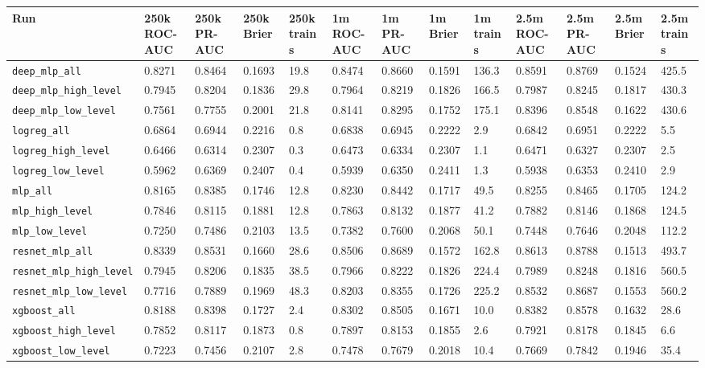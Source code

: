 \documentclass[11pt,a4paper,oneside]{report}
\begin{document}
\begin{landscape}

\small\setlength{\tabcolsep}{3pt}\renewcommand{\arraystretch}{1.15}
\begin{longtable}{p{2.2cm} p{1.35cm} p{1.35cm} p{1.35cm} p{1.35cm} p{1.35cm} p{1.35cm} p{1.35cm} p{1.35cm} p{1.35cm} p{1.35cm} p{1.35cm} p{1.35cm}}
\toprule
Run & 250k ROC-AUC & 250k PR-AUC & 250k Brier & 250k train s & 1m ROC-AUC & 1m PR-AUC & 1m Brier & 1m train s & 2.5m ROC-AUC & 2.5m PR-AUC & 2.5m Brier & 2.5m train s \\ \midrule
\texttt{deep\_mlp\_all} & 0.8271 & 0.8464 & 0.1693 & 19.8 & 0.8474 & 0.8660 & 0.1591 & 136.3 & 0.8591 & 0.8769 & 0.1524 & 425.5 \\ 
\texttt{deep\_mlp\_high\_level} & 0.7945 & 0.8204 & 0.1836 & 29.8 & 0.7964 & 0.8219 & 0.1826 & 166.5 & 0.7987 & 0.8245 & 0.1817 & 430.3 \\ 
\texttt{deep\_mlp\_low\_level} & 0.7561 & 0.7755 & 0.2001 & 21.8 & 0.8141 & 0.8295 & 0.1752 & 175.1 & 0.8396 & 0.8548 & 0.1622 & 430.6 \\ 
\texttt{logreg\_all} & 0.6864 & 0.6944 & 0.2216 & 0.8 & 0.6838 & 0.6945 & 0.2222 & 2.9 & 0.6842 & 0.6951 & 0.2222 & 5.5 \\ 
\texttt{logreg\_high\_level} & 0.6466 & 0.6314 & 0.2307 & 0.3 & 0.6473 & 0.6334 & 0.2307 & 1.1 & 0.6471 & 0.6327 & 0.2307 & 2.5 \\ 
\texttt{logreg\_low\_level} & 0.5962 & 0.6369 & 0.2407 & 0.4 & 0.5939 & 0.6350 & 0.2411 & 1.3 & 0.5938 & 0.6353 & 0.2410 & 2.9 \\ 
\texttt{mlp\_all} & 0.8165 & 0.8385 & 0.1746 & 12.8 & 0.8230 & 0.8442 & 0.1717 & 49.5 & 0.8255 & 0.8465 & 0.1705 & 124.2 \\ 
\texttt{mlp\_high\_level} & 0.7846 & 0.8115 & 0.1881 & 12.8 & 0.7863 & 0.8132 & 0.1877 & 41.2 & 0.7882 & 0.8146 & 0.1868 & 124.5 \\ 
\texttt{mlp\_low\_level} & 0.7250 & 0.7486 & 0.2103 & 13.5 & 0.7382 & 0.7600 & 0.2068 & 50.1 & 0.7448 & 0.7646 & 0.2048 & 112.2 \\ 
\texttt{resnet\_mlp\_all} & 0.8339 & 0.8531 & 0.1660 & 28.6 & 0.8506 & 0.8689 & 0.1572 & 162.8 & 0.8613 & 0.8788 & 0.1513 & 493.7 \\ 
\texttt{resnet\_mlp\_high\_level} & 0.7945 & 0.8206 & 0.1835 & 38.5 & 0.7966 & 0.8222 & 0.1826 & 224.4 & 0.7989 & 0.8248 & 0.1816 & 560.5 \\ 
\texttt{resnet\_mlp\_low\_level} & 0.7716 & 0.7889 & 0.1969 & 48.3 & 0.8203 & 0.8355 & 0.1726 & 225.2 & 0.8532 & 0.8687 & 0.1553 & 560.2 \\ 
\texttt{xgboost\_all} & 0.8188 & 0.8398 & 0.1727 & 2.4 & 0.8302 & 0.8505 & 0.1671 & 10.0 & 0.8382 & 0.8578 & 0.1632 & 28.6 \\ 
\texttt{xgboost\_high\_level} & 0.7852 & 0.8117 & 0.1873 & 0.8 & 0.7897 & 0.8153 & 0.1855 & 2.6 & 0.7921 & 0.8178 & 0.1845 & 6.6 \\ 
\texttt{xgboost\_low\_level} & 0.7223 & 0.7456 & 0.2107 & 2.8 & 0.7478 & 0.7679 & 0.2018 & 10.4 & 0.7669 & 0.7842 & 0.1946 & 35.4 \\ 
\bottomrule
\end{longtable}

\end{landscape}
\end{document}
